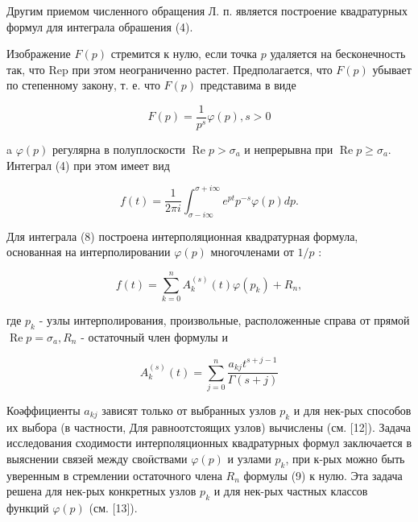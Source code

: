 \documentclass[10pt]{article}
\begin{document}
Другим приемом численного обращения Л. п. является построение квадратурных формул для интеграла обрашения (4).



Изображение $F(p)$ стремится к нулю, если точка $p$ удаляется на бесконечность так, что Rep при этом неограниченно растет. Предполагается, что $F(p)$ убывает по степенному закону, т. е. что $F(p)$ представима в виде



\[

F(p)=\frac{1}{p^{s}} \varphi(p), s>0

\]



a $\varphi(p)$ регулярна в полуплоскости $\operatorname{Re} p>\sigma_{a}$ и непрерывна при $\operatorname{Re} p \geqslant \sigma_{a}$. Интеграл (4) при этом имеет вид



\[

f(t)=\frac{1}{2 \pi i} \int_{\sigma-i \infty}^{\sigma+i \infty} e^{p t} p^{-s} \varphi(p) d p .

\]



Для интеграла (8) построена интерполяционная квадратурная формула, основанная на интерполировании $\varphi(p)$ многочленами от $1 / p$ :



\[

f(t)=\sum_{k=0}^{n} A_{k}^{(s)}(t) \varphi\left(p_{k}\right)+R_{n},

\]



где $p_{k}$ - узлы интерполирования, произвольные, расположенные справа от прямой $\operatorname{Re} p=\sigma_{a}, R_{n}$ - остаточный член формулы и



\[

A_{k}^{(s)}(t)=\sum_{j=0}^{n} \frac{a_{k j} t^{s+j-1}}{\Gamma(s+j)}

\]



Коәффициенты $a_{k j}$ зависят только от выбранных узлов $p_{k}$ и для нек-рых способов их выбора (в частности, Для равноотстоящих узлов) вычислены (см. [12]). Задача исследования сходимости интерполяционных квадратурных формул заключается в выяснении связей между своӥствами $\varphi(p)$ и узлами $p_{k}$, при к-рых можно быть уверенным в стремлении остаточного члена $R_{n}$ формулы (9) к нулю. Эта задача решена для нек-рых конкретных узлов $p_{k}$ и для нек-рых частных классов функций $\varphi(p)$ (см. [13]).
\end{document}
